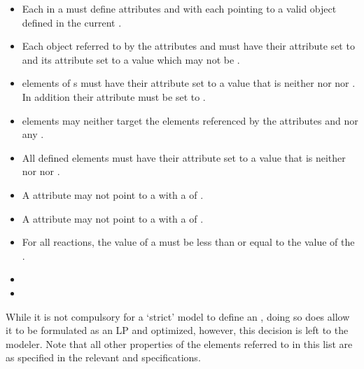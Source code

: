 \begin{itemize}
	\item { Each \Reaction in a \Model must define attributes  and  with each pointing to a valid \Parameter object defined in the current \Model.}
	\item {Each \Parameter object referred to by the \Reaction attributes  and  must have their  attribute set to  and its  attribute set to a  value which may not be .
	}
	\item { \SpeciesReference elements of {\Reaction}s must have their  attribute set to a  value that is neither  nor  nor . In addition their  attribute must be set to .
	}
	\item { \InitialAssignment elements may neither target the {\Parameter} elements referenced by the \Reaction attributes  and
	         nor any \SpeciesReference.
	}
	\item { All defined \FluxObjective elements must have their  attribute set to a  value that is neither  nor  nor .
	}
	\item { A \Reaction {} attribute may not point to a \Parameter with a  of .}
	\item { A \Reaction {} attribute may not point to a \Parameter with a  of .}
    \item {For all reactions, the value of a  must be less than or equal to the value of the .}
    \item {}
    \item {}

\end{itemize}
%
While it is not compulsory for a `strict' \FBC model to define an \Objective, doing so does allow it to be formulated as an LP and optimized, however, this decision is left to the modeler. Note that all other properties of the elements referred to in this list are as specified in the relevant \sbmlthreecore and \FBC specifications.

